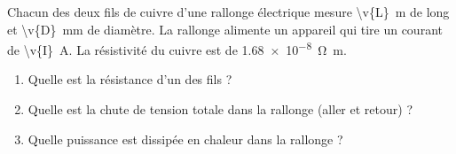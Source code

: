Chacun des deux fils de cuivre d'une rallonge électrique mesure \qty{\v{L}}{m} de long et \qty{\v{D}}{mm} de diamètre. La rallonge alimente un appareil qui tire un courant de \qty{\v{I}}{A}. La résistivité du cuivre est de \qty{1.68e-8}{\ohm.m}.

\begin{enumerate}[label=\alph*)]
    \item Quelle est la résistance d'un des fils ?
    \item Quelle est la chute de tension totale dans la rallonge (aller et retour) ?
    \item Quelle puissance est dissipée en chaleur dans la rallonge ?
\end{enumerate}
